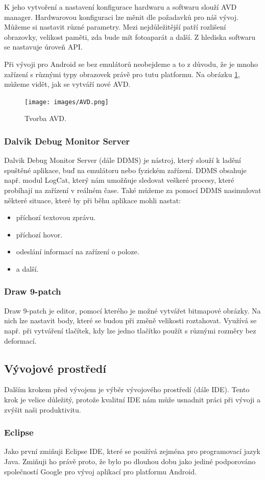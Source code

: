 \documentclass[12pt]{article}
\begin{document}
K jeho vytvoření a nastavení konfigurace hardwaru a softwaru slouží AVD manager. Hardwarovou konfiguraci lze měnit dle požadavků pro náš vývoj. Můžeme si nastavit různé parametry. Mezi nejdůležitější patří rozlišení obrazovky, velikost paměti, zda bude mít fotoaparát a další. Z hlediska softwaru se nastavuje úroveň API.

Při vývoji pro Android se bez emulátorů neobejdeme a to z důvodu, že je mnoho zařízení s různými typy obrazovek právě pro tutu platformu. Na obrázku \ref{avd}, můžeme vidět, jak se vytváří nové AVD.
\newpage
\begin{figure}[ht]
\centerline{\texttt{[image: images/AVD.png]}}
\caption{Tvorba AVD.} \label{avd}
\end{figure}

\subsubsection{Dalvik Debug Monitor Server}
Dalvik Debug Monitor Server (dále DDMS) je nástroj, který slouží k ladění spuštěné aplikace, buď na emulátoru nebo fyzickém zařízení. DDMS obsahuje např. modul LogCat, který nám umožňuje sledovat veškeré procesy, které probíhají na zařízení v reálném čase. Také můžeme za pomocí DDMS nasimulovat některé situace, které by při běhu aplikace mohli nastat:
\begin{itemize}
\item příchozí textovou zprávu.
\item příchozí hovor.
\item odeslání informací na zařízení o poloze.
\item a další.
\end{itemize}
\subsubsection{Draw 9-patch}
Draw 9-patch je editor, pomocí kterého je možné vytvářet bitmapové obrázky. Na nich lze nastavit body, které se budou při změně velikosti roztahovat. Využívá se např. při vytváření tlačítek, kdy lze jedno tlačítko použít s různými rozměry bez deformací.
\subsection{Vývojové prostředí}
Dalším krokem před vývojem je výběr vývojového prostředí (dále IDE). Tento krok je velice důležitý, protože kvalitní IDE nám může usnadnit práci při vývoji a zvýšit naši produktivitu.
\subsubsection{Eclipse}
Jako první zmiňuji Eclipse IDE, které se používá zejména pro programovací jazyk Java. Zmiňuji ho právě proto, že bylo po dlouhou dobu jako jediné podporováno společností Google pro vývoj aplikací pro platformu Android.
\end{document}
